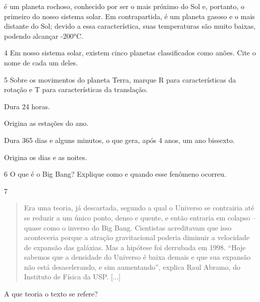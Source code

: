 é um planeta rochoso, conhecido por ser
o mais próximo do Sol e, portanto, o primeiro do nosso sistema solar. Em
contrapartida,  é um planeta gasoso e o mais distante
do Sol; devido a essa característica, suas temperaturas são muito
baixas, podendo alcançar -200°C. 

\num{4}  Em nosso sistema solar, existem cinco planetas classificados como anões. Cite o nome de cada um deles.



\num{5}  Sobre os movimentos do planeta Terra, marque R para características da rotação e T para características da translação.

\begin{boxlist}
 Dura 24 horas.

 Origina as estações do ano.

 Dura 365 dias e alguns minutos, o que gera, após 4 anos, um ano
bissexto.

 Origina os dias e as noites.
\end{boxlist}

\num{6}  O que é o Big Bang? Explique como e quando esse fenômeno ocorreu.



\num{7}

\begin{quote}
Era uma teoria, já descartada, segundo a qual o Universo se contrairia até
  se reduzir a um único ponto, denso e quente, e então entraria em
  colapso -- quase como o inverso do Big Bang. Cientistas acreditavam
  que isso aconteceria porque a atração gravitacional poderia diminuir a
  velocidade de expansão das galáxias. Mas a hipótese foi derrubada em
  1998. ``Hoje sabemos que a densidade do Universo é baixa demais e que
  sua expansão não está desacelerando, e sim aumentando'', explica Raul
  Abramo, do Instituto de Física da USP. [...]

\end{quote}

A que teoria o texto se refere?



